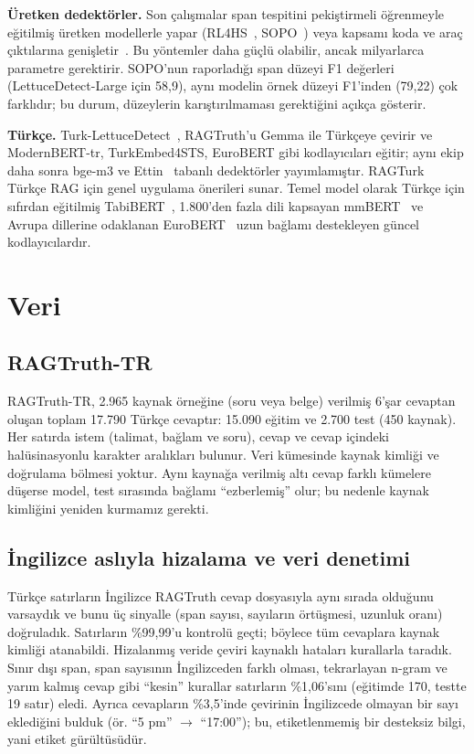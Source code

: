 \documentclass[conference,a4paper]{IEEEtran}
\begin{document}
\textbf{Üretken dedektörler.} Son çalışmalar span tespitini pekiştirmeli öğrenmeyle eğitilmiş üretken modellerle yapar (RL4HS~\cite{su2025rl4hs}, SOPO~\cite{dong2026sopo}) veya kapsamı koda ve araç çıktılarına genişletir~\cite{kovacs2026beyond}. Bu yöntemler daha güçlü olabilir, ancak milyarlarca parametre gerektirir. SOPO'nun raporladığı span düzeyi F1 değerleri (LettuceDetect-Large için 58{,}9), aynı modelin örnek düzeyi F1'inden (79{,}22) çok farklıdır; bu durum, düzeylerin karıştırılmaması gerektiğini açıkça gösterir.

\textbf{Türkçe.} Turk-LettuceDetect~\cite{tas2025turk}, RAGTruth'u Gemma ile Türkçeye çevirir ve ModernBERT-tr, TurkEmbed4STS, EuroBERT gibi kodlayıcıları eğitir; aynı ekip daha sonra bge-m3 ve Ettin~\cite{weller2025ettin} tabanlı dedektörler yayımlamıştır. RAGTurk~\cite{kose2026ragturk} Türkçe RAG için genel uygulama önerileri sunar. Temel model olarak Türkçe için sıfırdan eğitilmiş TabiBERT~\cite{turker2025tabibert}, 1.800'den fazla dili kapsayan mmBERT~\cite{marone2025mmbert} ve Avrupa dillerine odaklanan EuroBERT~\cite{boizard2025eurobert} uzun bağlamı destekleyen güncel kodlayıcılardır.

\section{Veri}

\subsection{RAGTruth-TR}
RAGTruth-TR, 2.965 kaynak örneğine (soru veya belge) verilmiş $6$'şar cevaptan oluşan toplam 17.790 Türkçe cevaptır: 15.090 eğitim ve 2.700 test (450 kaynak). Her satırda istem (talimat, bağlam ve soru), cevap ve cevap içindeki halüsinasyonlu karakter aralıkları bulunur. Veri kümesinde kaynak kimliği ve doğrulama bölmesi yoktur. Aynı kaynağa verilmiş altı cevap farklı kümelere düşerse model, test sırasında bağlamı ``ezberlemiş'' olur; bu nedenle kaynak kimliğini yeniden kurmamız gerekti.

\subsection{İngilizce aslıyla hizalama ve veri denetimi}
Türkçe satırların İngilizce RAGTruth cevap dosyasıyla aynı sırada olduğunu varsaydık ve bunu üç sinyalle (span sayısı, sayıların örtüşmesi, uzunluk oranı) doğruladık. Satırların \%99{,}99'u kontrolü geçti; böylece tüm cevaplara kaynak kimliği atanabildi. Hizalanmış veride çeviri kaynaklı hataları kurallarla taradık. Sınır dışı span, span sayısının İngilizceden farklı olması, tekrarlayan n-gram ve yarım kalmış cevap gibi ``kesin'' kurallar satırların \%1{,}06'sını (eğitimde 170, testte 19 satır) eledi. Ayrıca cevapların \%3{,}5'inde çevirinin İngilizcede olmayan bir sayı eklediğini bulduk (ör. ``5 pm'' $\rightarrow$ ``17:00''); bu, etiketlenmemiş bir desteksiz bilgi, yani etiket gürültüsüdür.
\end{document}
